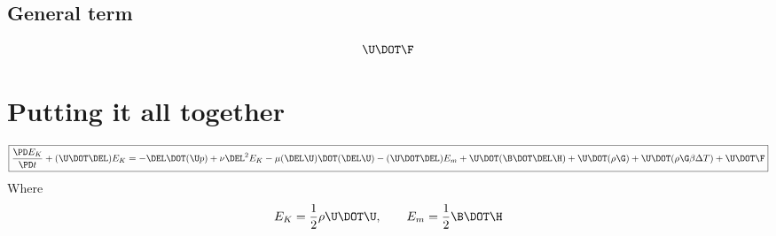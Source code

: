 \documentclass[11pt]{article}
\begin{document}
\subsection{General term}
\begin{equation}
	\U \DOT \F
\end{equation}

\section{Putting it all together}
\begin{equation}
	\boxed{
	\frac{\PD E_K}{\PD t} +
	(\U \DOT \DEL) E_K =
	- \DEL \DOT (\U p)
	+ \nu \DEL^2 E_K
	- \mu (\DEL \U) \DOT (\DEL \U)
	- (\U \DOT \DEL) E_m
	+ \U \DOT (\B \DOT \DEL \H)
	+ \U \DOT (\rho \G)
	+ \U \DOT (\rho \G \beta \Delta T)
	+ \U \DOT \F
	}
\end{equation}
Where
\begin{equation}
	E_K = \frac{1}{2} \rho \U \DOT \U, \qquad
	E_m = \frac{1}{2} \B \DOT \H
\end{equation}
\end{document}
